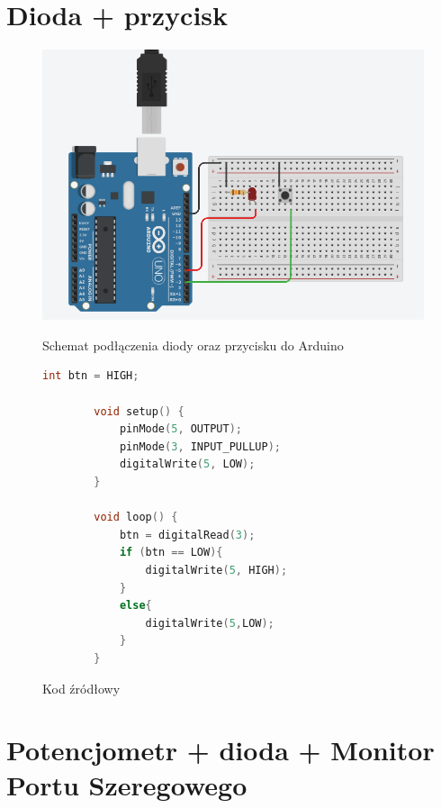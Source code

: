 \documentclass[12pt]{article}
\begin{document}
	\section{Dioda + przycisk}
	\begin{figure}[h!]
		\begin{center}
			\includegraphics[scale=0.4]{02_button.png}
			\caption*{Schemat podłączenia diody oraz przycisku do Arduino}
		\end{center}
		\begin{lstlisting}[language=C++]
		int btn = HIGH;
		
		void setup() {
			pinMode(5, OUTPUT);
			pinMode(3, INPUT_PULLUP);
			digitalWrite(5, LOW);
		}
		
		void loop() {
			btn = digitalRead(3);
			if (btn == LOW){
				digitalWrite(5, HIGH);
			}
			else{
				digitalWrite(5,LOW);
			}
		}
		\end{lstlisting}
		\caption*{Kod źródłowy}
	\end{figure}
	
	\newpage
	\section{Potencjometr + dioda + Monitor Portu Szeregowego}
\end{document}
